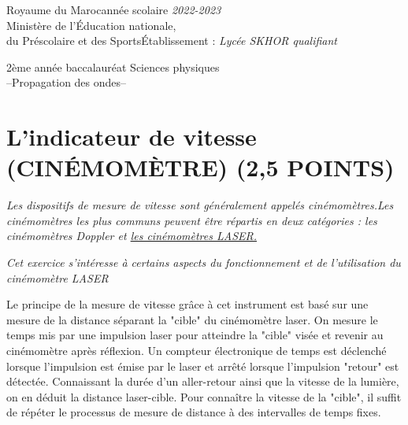 \documentclass[12pt]{article}
\newcommand\headerMe[2]{\noindent{}#1\hfill#2}
\begin{document}
\headerMe{Royaume du Maroc}{année scolaire \emph{2022-2023}}\\
\headerMe{Ministère de l'Éducation nationale, }{  }\\
\headerMe{du Préscolaire et des Sports}{Établissement : \emph{Lycée SKHOR qualifiant}}\\
\begin{center}
    2ème année baccalauréat Sciences physiques\\
    \vspace{.2cm}
\hrulefill
\Large{--Propagation des ondes--}
\hrulefill\\

\end{center}

 \section*{L'indicateur de vitesse (CINÉMOMÈTRE) \dotfill (2,5 POINTS)  }

 \emph{Les dispositifs de mesure de vitesse sont généralement appelés cinémomètres.Les cinémomètres les plus communs peuvent être répartis en deux catégories : les cinémomètres Doppler et \underline{les cinémomètres LASER.}}

 \emph{Cet exercice s’intéresse à certains aspects du fonctionnement et de l’utilisation du cinémomètre LASER}
 \begin{tcolorbox}
Le principe de la mesure de vitesse grâce à cet instrument est basé sur une mesure de la distance
séparant la "cible" du cinémomètre laser. On mesure le temps mis par une impulsion laser pour
atteindre la "cible" visée et revenir au cinémomètre après réflexion. Un compteur électronique de
temps est déclenché lorsque l’impulsion est émise par le laser et arrêté lorsque l’impulsion "retour" est détectée. Connaissant la durée d’un aller-retour ainsi que la vitesse de la lumière, on
en déduit la distance laser-cible. Pour connaître la vitesse de la "cible", il suffit de répéter le
processus de mesure de distance à des intervalles de temps fixes. 
\end{tcolorbox}
\end{document}
